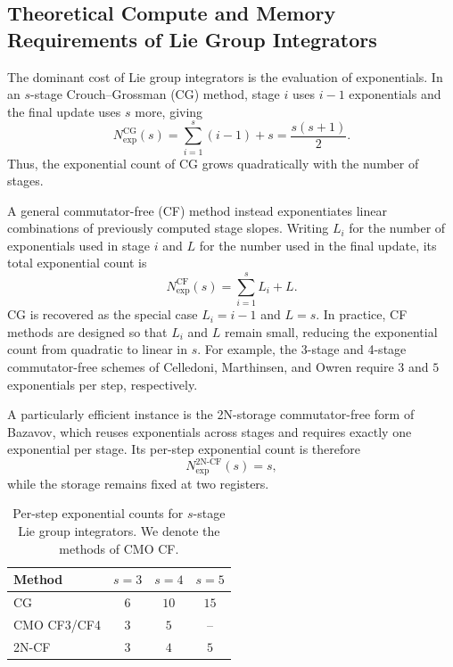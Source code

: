 \documentclass{article}
\theoremstyle{definition}
\theoremstyle{remark}
\begin{document}
\subsection{Theoretical Compute and Memory Requirements of Lie Group Integrators}
The dominant cost of Lie group integrators is the evaluation of exponentials.
In an \(s\)-stage Crouch--Grossman (CG) method, stage \(i\) uses \(i-1\) exponentials and the final update uses \(s\) more, giving
\[
N_{\exp}^{\mathrm{CG}}(s)
=
\sum_{i=1}^s (i-1) + s
=
\frac{s(s+1)}{2}.
\]
Thus, the exponential count of CG grows quadratically with the number of stages.

A general commutator-free (CF) method instead exponentiates linear combinations of previously computed stage slopes. Writing \(L_i\) for the number of exponentials used in stage \(i\) and \(L\) for the number used in the final update, its total exponential count is
\[
N_{\exp}^{\mathrm{CF}}(s)
=
\sum_{i=1}^s L_i + L.
\]
CG is recovered as the special case \(L_i=i-1\) and \(L=s\). In practice, CF methods are designed so that \(L_i\) and \(L\) remain small, reducing the exponential count from quadratic to linear in \(s\). For example, the 3-stage and 4-stage commutator-free schemes of Celledoni, Marthinsen, and Owren require \(3\) and \(5\) exponentials per step, respectively.

A particularly efficient instance is the 2N-storage commutator-free form of Bazavov, which reuses exponentials across stages and requires exactly one exponential per stage. Its per-step exponential count is therefore
\[
N_{\exp}^{\mathrm{2N\text{-}CF}}(s)=s,
\]
while the storage remains fixed at two registers.

\begin{table}[h]
\centering
\caption{Per-step exponential counts for \(s\)-stage Lie group integrators. We denote the methods of \cite{celledoni_commutator-free_2003} CMO CF.}
\label{tab:exp_counts}
\begin{tabular}{lccc}
\toprule
Method & \(s=3\) & \(s=4\) & \(s=5\) \\
\midrule
CG & \(6\) & \(10\) & \(15\) \\
CMO CF3/CF4 & \(3\) & \(5\) & -- \\
2N-CF & \(3\) & \(4\) & \(5\) \\
\bottomrule
\end{tabular}
\end{table}
\end{document}
